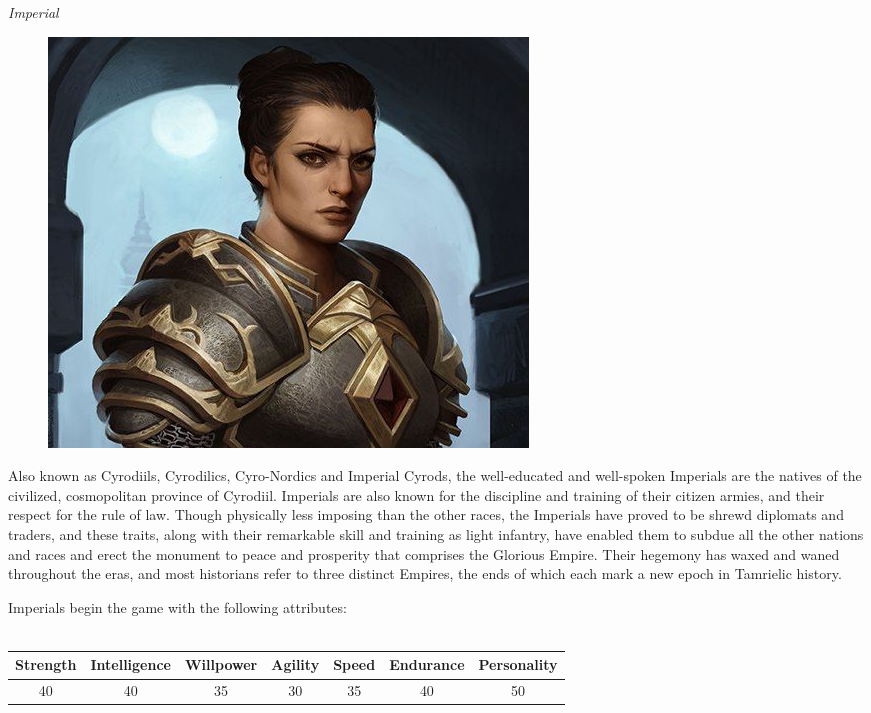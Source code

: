 \documentclass[12pt]{article}
\begin{document}
\noindent
\textit{Imperial}
\begin{figure}
	\includegraphics[width=\textwidth]{Imperial.png}
\end{figure}

Also known as Cyrodiils, Cyrodilics, Cyro-Nordics and Imperial Cyrods, the well-educated and well-spoken Imperials are the natives of the civilized, cosmopolitan province of Cyrodiil. Imperials are also known for the discipline and training of their citizen armies, and their respect for the rule of law. Though physically less imposing than the other races, the Imperials have proved to be shrewd diplomats and traders, and these traits, along with their remarkable skill and training as light infantry, have enabled them to subdue all the other nations and races and erect the monument to peace and prosperity that comprises the Glorious Empire. Their hegemony has waxed and waned throughout the eras, and most historians refer to three distinct Empires, the ends of which each mark a new epoch in Tamrielic history.

Imperials begin the game with the following attributes:\\~\\
\begin{tabular}{|c|c|c|c|c|c|c|}
\hline
Strength & Intelligence & Willpower & Agility & Speed & Endurance & Personality\\ \hline
40 & 40 & 35 & 30 & 35 & 40 & 50\\ \hline

\end{tabular}\\
\end{document}

